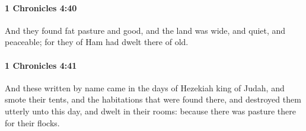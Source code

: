 		\paragraph{1 Chronicles 4:40} %
			\label{1CHRONICLES-4-40}

			And they found fat pasture and good, and the land was wide, and quiet, and peaceable; for they of Ham had dwelt there of old.


		\paragraph{1 Chronicles 4:41} %
			\label{1CHRONICLES-4-41}

			And these written by name came in the days of Hezekiah king of Judah, and smote their tents, and the habitations that were found there, and destroyed them utterly unto this day, and dwelt in their rooms: because there was pasture there for their flocks.

